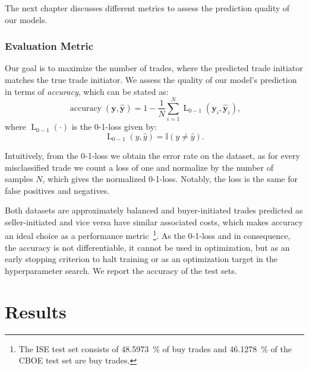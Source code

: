 The next chapter discusses different metrics to assess the prediction quality of our models.

\subsubsection{Evaluation Metric}\label{sec:evaluation-metric}

Our goal is to maximize the number of trades, where the predicted trade initiator matches the true trade initiator. We assess the quality of our model’s prediction in terms of \emph{accuracy}, which can be stated as:
\begin{equation}
    \operatorname{accuracy}(\mathbf{y}, \widehat{\mathbf{y}}) = 1 - \frac{1}{N}\sum_{i=1}^{N} \operatorname{L}_{0-1}(\mathbf{y}_i, \widehat{\mathbf{y}}_i),
\end{equation}
where $\operatorname{L}_{0-1}(\cdot)$ is the 0-1-loss given by:
\begin{equation}
    \operatorname{L}_{0-1}(y, \hat{y}) = \mathbb{I}\left(y\neq \hat{y}\right).
\end{equation}

Intuitively, from the 0-1-loss we obtain the error rate on the dataset, as for every misclassified trade we count a loss of one and normalize by the number of samples $N$, which gives the normalized 0-1-loss. Notably, the loss is the same for false positives and negatives.

Both datasets are approximately balanced and buyer-initiated trades predicted as seller-initiated and vice versa have similar associated costs, which makes accuracy an ideal choice as a performance metric~\footnote{The \gls{ISE} test set consists of \SI{48.5973}{\percent} of buy trades and \SI{46.1278}{\percent} of the \gls{CBOE} test set are buy trades.}. As the 0-1-loss and in consequence, the accuracy is not differentiable, it cannot be used in optimization, but as an early stopping criterion to halt training or as an optimization target in the hyperparameter search. We report the accuracy of the test sets.

\newpage
\section{Results}\label{sec:results}



